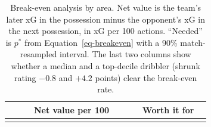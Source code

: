 \documentclass[
  12pt]{article}
\begin{document}
\begin{longtable}[]{@{}
  >{\raggedright\arraybackslash}p{}
  >{\raggedright\arraybackslash}p{}
  >{\raggedleft\arraybackslash}p{}
  >{\raggedleft\arraybackslash}p{}
  >{\raggedleft\arraybackslash}p{}
  >{\raggedleft\arraybackslash}p{}
  >{\raggedleft\arraybackslash}p{}
  >{\centering\arraybackslash}p{}
  >{\centering\arraybackslash}p{}@{}}
\caption{Break-even analysis by area. Net value is the team's later xG
in the possession minus the opponent's xG in the next possession, in xG
per 100 actions. ``Needed'' is \(p^*\) from Equation~\ref{eq-breakeven}
with a 90\% match-resampled interval. The last two columns show whether
a median and a top-decile dribbler (shrunk rating \(-0.8\) and \(+4.2\)
points) clear the break-even rate.}\label{tbl-breakeven}\tabularnewline
\toprule\noalign{}
\begin{minipage}[b]{\linewidth}\raggedright
\end{minipage} & \begin{minipage}[b]{\linewidth}\raggedright
\end{minipage} & \begin{minipage}[b]{\linewidth}\raggedleft
\end{minipage} & \begin{minipage}[b]{\linewidth}\raggedleft
Net value per 100
\end{minipage} & \begin{minipage}[b]{\linewidth}\raggedleft
\end{minipage} & \begin{minipage}[b]{\linewidth}\raggedleft
\end{minipage} & \begin{minipage}[b]{\linewidth}\raggedleft
\end{minipage} & \begin{minipage}[b]{\linewidth}\centering
Worth it for
\end{minipage} & \begin{minipage}[b]{\linewidth}\centering
\end{minipage} \\
\midrule\noalign{}
\endfirsthead
\toprule\noalign{}

\end{longtable}
\end{document}
